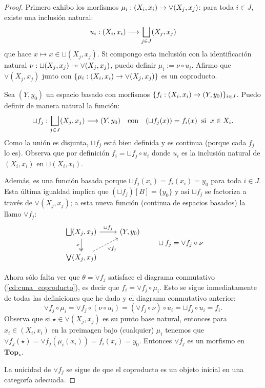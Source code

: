 \documentclass[../../topologia_algebraica]{subfiles}
\begin{document}
\begin{proof}
  Primero exhibo los morfismos $\mu_i:(X_i,x_i)\rightarrow\vee(X_j,x_j)$: para toda $i\in J$, existe una
  inclusi\'on natural:
  \[
    u_i:(X_i,x_i) \longrightarrow \bigsqcup_{j\in J} (X_j,x_j)
  \]
  que hace $x\mapsto x\in\sqcup(X_j,x_j)$. Si compongo esta inclusi\'on con la identificaci\'on
  natural $\nu:\sqcup(X_j,x_j)\twoheadrightarrow\vee(X_j,x_j)$, puedo definir $\mu_i:=\nu\circ u_i$. Afirmo
  que $\vee(X_j,x_j)$ junto con $\{\mu_i:(X_i,x_i)\rightarrow\vee(X_j,x_j)\}$ es un coproducto.

  Sea $(Y,y_0)$ un espacio basado con morfismos $\{f_i:(X_i,x_i)\rightarrow (Y,y_0)\}_{i\in J}$.
  Puedo definir de manera natural la funci\'on: 
  \[
    \sqcup f_j:\bigsqcup_{j\in J}(X_j,x_j)\longrightarrow (Y,y_0) \quad\text{con}\quad
    (\sqcup f_j(x))=f_i(x) \;\;\text{si}\;\; x\in X_i.
  \]
  Como la uni\'on es disjunta, $\sqcup f_j$ est\'a bien definida y es continua (porque cada $f_j$
  lo es). Observa que por definici\'on $f_i=\sqcup f_j\circ u_i$ donde $u_i$ es la inclusi\'on
  natural de $(X_i,x_i)$ en $\sqcup (X_i,x_i)$.

  Adem\'as, es una funci\'on basada porque $\sqcup f_j(x_i)=f_i(x_i)=y_0$ para toda $i\in J$.
  Esta \'ultima igualdad implica que $(\sqcup f_j)[B]=\{y_0\}$ y as\'i $\sqcup f_j$ se factoriza a
  trav\'es de $\vee(X_j,x_j)$; a esta nueva funci\'on (continua de espacios basados) la llamo
  $\vee f_j$:
  \[
    \begin{tikzcd}
      \bigsqcup (X_j,x_j) \arrow[r,"\sqcup f_j"] \arrow[d,twoheadrightarrow,"\nu"'] & (Y,y_0) \\
      \bigvee (X_j,x_j) \arrow[ur,dashed,"\vee f_j"']
    \end{tikzcd}
    \qquad \sqcup f_j=\vee f_j \circ \nu
  \]

  Ahora s\'olo falta ver que $\theta=\vee f_j$ satisface el diagrama conmutativo
  (\ref{cd:cuna_coproducto}), es decir que $f_i=\vee f_j\circ \mu_i$. Esto se sigue inmediatamente
  de todas las definiciones que he dado y el diagrama conmutativo anterior:
  \[
    \vee f_j \circ \mu_i =\vee f_j \circ (\nu \circ u_i)=(\vee f_j \circ \nu) \circ u_i=
    \sqcup f_j \circ u_i=f_i.
  \]
  Observa que si $\star\in\vee (X_j,x_j)$ es su punto base natural, entonces para
  $x_i\in(X_i,x_i)$ en la preimagen bajo (cualquier) $\mu_i$ tenemos que
  $\vee f_j(\star)=\vee f_j(\mu_i(x_i))=
  f_i(x_i)=y_0$. Entonces $\vee f_j$ es un morfismo en $\mathbf{Top}_*$.

  La unicidad de $\vee f_j$ se sigue de que el coproducto es un objeto inicial en una categor\'ia
  adecuada.  
\end{proof}
\end{document}
